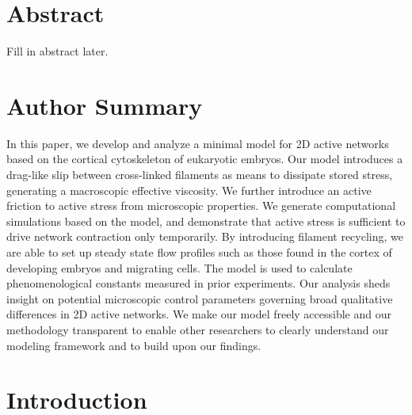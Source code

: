 \documentclass[10pt,letterpaper]{article}
\begin{document}
\section*{Abstract}
Fill in abstract later.


\section*{Author Summary}
In this paper, we develop and analyze a minimal model for 2D active networks based on the cortical cytoskeleton of eukaryotic embryos.  Our model introduces a drag-like slip between cross-linked filaments as means to dissipate stored stress, generating a macroscopic effective viscosity.  We further introduce an active friction to active stress from microscopic properties.  We generate computational simulations based on the model, and demonstrate that active stress is sufficient to drive network contraction only temporarily.  By introducing filament recycling, we are able to set up steady state flow profiles such as those found in the cortex of developing embryos and migrating cells.  The model is used to calculate phenomenological constants measured in prior experiments.  Our analysis sheds insight on potential microscopic control parameters governing broad qualitative differences in 2D active networks.  We make our model freely accessible and our methodology transparent to enable other researchers to clearly understand our modeling framework and to build upon our findings.

\linenumbers

\section*{Introduction}
\end{document}

